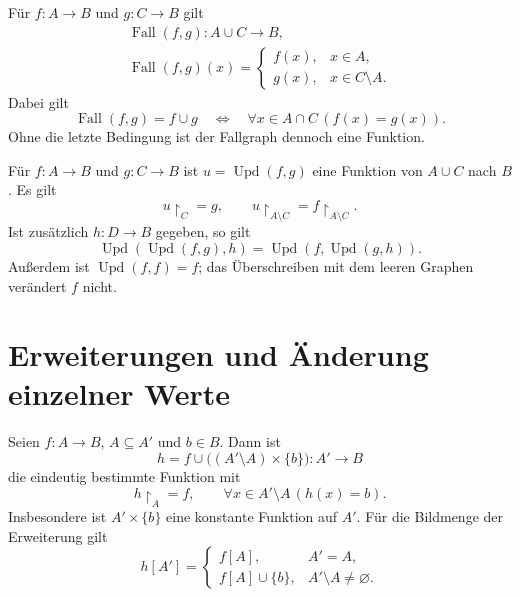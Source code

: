 \begin{theorem}
\label{b05guide:thm:case-function}
Für $f\colon A\to B$ und $g\colon C\to B$ gilt
\[
 \begin{gathered}
 \operatorname{Fall}(f,g)\colon A\cup C\to B,\\
 \operatorname{Fall}(f,g)(x)=
 \begin{cases}
 f(x),&x\in A,\\
 g(x),&x\in C\setminus A.
 \end{cases}
 \end{gathered}
\]
Dabei gilt
\[
 \operatorname{Fall}(f,g)=f\cup g
 \quad\Longleftrightarrow\quad
 \forall x\in A\cap C\,(f(x)=g(x)).
\]
Ohne die letzte Bedingung ist der Fallgraph dennoch eine Funktion.
\end{theorem}

\begin{theorem}
\label{b05guide:thm:override}
Für $f\colon A\to B$ und $g\colon C\to B$ ist
$u=\operatorname{Upd}(f,g)$ eine Funktion von $A\cup C$ nach $B$.
Es gilt
\[
 u\restriction_C=g,\qquad
 u\restriction_{A\setminus C}=f\restriction_{A\setminus C}.
\]
Ist zusätzlich $h\colon D\to B$ gegeben, so gilt
\[
 \operatorname{Upd}(\operatorname{Upd}(f,g),h)
   =\operatorname{Upd}(f,\operatorname{Upd}(g,h)).
\]
Außerdem ist $\operatorname{Upd}(f,f)=f$;
das Überschreiben mit dem leeren Graphen verändert $f$ nicht.
\end{theorem}

\section{Erweiterungen und Änderung einzelner Werte}

\begin{theorem}
\label{b05guide:thm:constant-extension}
Seien $f\colon A\to B$, $A\subseteq A'$ und $b\in B$.
Dann ist
\[
 h=f\cup\bigl((A'\setminus A)\times\{b\}\bigr)
       \colon A'\to B
\]
die eindeutig bestimmte Funktion mit
\[
 h\restriction_A=f,\qquad
 \forall x\in A'\setminus A\,(h(x)=b).
\]
Insbesondere ist $A'\times\{b\}$ eine konstante Funktion
auf $A'$. Für die Bildmenge der Erweiterung gilt
\[
 h[A']=
 \begin{cases}
 f[A],&A'=A,\\
 f[A]\cup\{b\},&A'\setminus A\ne\varnothing.
 \end{cases}
\]
\end{theorem}

